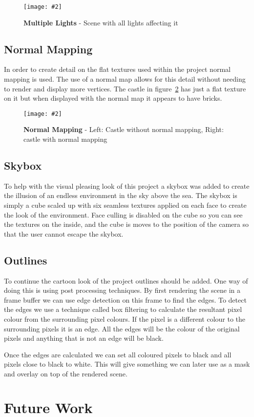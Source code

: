 \documentclass[10pt, a4paper]{article}
\newcommand{\figuremacro}[5]{
    \begin{figure}[#1]
        \centering
        \texttt{[image: \#2]}
        \caption[#3]{\textbf{#3}#4}
        \label{fig:#2}
    \end{figure}
}
\begin{document}
	 \figuremacro{h}{Multiple}{Multiple Lights}{ - Scene with all lights affecting it}{1.0}
	 
	 \subsection{Normal Mapping}
	 In order to create detail on the flat textures used within the project normal mapping is used. The use of a normal map allows for this detail without needing to render and display more vertices. The castle in figure~\ref{fig:Normals} has just a flat texture on it but when displayed with the normal map it appears to have bricks.
	 
	 \figuremacro{h}{Normals}{Normal Mapping}{ - Left: Castle without normal mapping, Right: castle with normal mapping}{1.0}
	 
	 \subsection{Skybox}
	 To help with the visual pleasing look of this project a skybox was added to create the illusion of an endless environment in the sky above the sea. The skybox is simply a cube scaled up with six seamless textures applied on each face to create the look of the environment. Face culling is disabled on the cube so you can see the textures on the inside, and the cube is moves to the position of the camera so that the user cannot escape the skybox.
	 
	 \subsection{Outlines}
	 To continue the cartoon look of the project outlines should be added. One way of doing this is using post processing techniques. By first rendering the scene in a frame buffer we can use edge detection on this frame to find the edges. To detect the edges we use a technique called box filtering to calculate the resultant pixel colour from the surrounding pixel colours. If the pixel is a different colour to the surrounding pixels it is an edge. All the edges will be the colour of the original pixels and anything that is not an edge will be black.
	 
	 Once the edges are calculated we can set all coloured pixels to black and all pixels close to black to white. This will give something we can later use as a mask and overlay on top of the rendered scene.
	 
	
	\section{Future Work}
\end{document}
